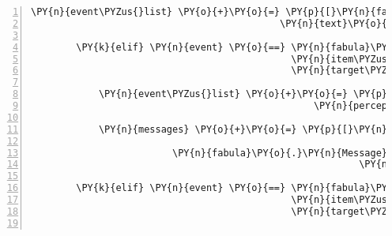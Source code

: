 \begin{Verbatim}[commandchars=\\\{\},numbers=left,firstnumber=1,stepnumber=1]
            \PY{n}{event\PYZus{}list} \PY{o}{+}\PY{o}{=} \PY{p}{[}\PY{n}{fabula}\PY{o}{.}\PY{n}{SaysEvent}\PY{p}{(}\PY{n}{identifier}\PY{o}{=}\PY{l+s}{\PYZsq{}}\PY{l+s}{guardian}\PY{l+s}{\PYZsq{}}\PY{p}{,}
                                            \PY{n}{text}\PY{o}{=}\PY{l+s}{\PYZsq{}}\PY{l+s}{Was soll ich mit einem Klangkörper ohne Saite?}\PY{l+s}{\PYZsq{}}\PY{p}{)}\PY{p}{]}

        \PY{k}{elif} \PY{n}{event} \PY{o}{==} \PY{n}{fabula}\PY{o}{.}\PY{n}{TriesToDropEvent}\PY{p}{(}\PY{n}{identifier}\PY{o}{=}\PY{n}{ID\PYZus{}CASSANDRA}\PY{p}{,}
                                              \PY{n}{item\PYZus{}identifier}\PY{o}{=}\PY{l+s}{\PYZsq{}}\PY{l+s}{lute}\PY{l+s}{\PYZsq{}}\PY{p}{,}
                                              \PY{n}{target\PYZus{}identifier}\PY{o}{=}\PY{n}{ID\PYZus{}KUNI}\PY{p}{)}\PY{p}{:}

            \PY{n}{event\PYZus{}list} \PY{o}{+}\PY{o}{=} \PY{p}{[}\PY{n}{fabula}\PY{o}{.}\PY{n}{PerceptionEvent}\PY{p}{(}\PY{n}{identifier}\PY{o}{=}\PY{n}{ID\PYZus{}CASSANDRA}\PY{p}{,}
                                                  \PY{n}{perception}\PY{o}{=}\PY{l+s}{\PYZsq{}}\PY{l+s}{Kuni schüttelt den Kopf.}\PY{l+s}{\PYZsq{}}\PY{p}{)}\PY{p}{]}

            \PY{n}{messages} \PY{o}{+}\PY{o}{=} \PY{p}{[}\PY{n}{fabula}\PY{o}{.}\PY{n}{Message}\PY{p}{(}\PY{p}{[}\PY{n}{fabula}\PY{o}{.}\PY{n}{PerceptionEvent}\PY{p}{(}\PY{n}{identifier}\PY{o}{=}\PY{n}{ID\PYZus{}KUNI}\PY{p}{,}
                                                                \PY{n}{perception}\PY{o}{=}\PY{l+s}{\PYZsq{}}\PY{l+s}{Cassandra möchte dir die Laute überreichen.}\PY{l+s}{\PYZsq{}}\PY{p}{)}\PY{p}{]}\PY{p}{)}\PY{p}{,}
                         \PY{n}{fabula}\PY{o}{.}\PY{n}{Message}\PY{p}{(}\PY{p}{[}\PY{n}{fabula}\PY{o}{.}\PY{n}{SaysEvent}\PY{p}{(}\PY{n}{identifier}\PY{o}{=}\PY{n}{ID\PYZus{}KUNI}\PY{p}{,}
                                                          \PY{n}{text}\PY{o}{=}\PY{l+s}{\PYZsq{}}\PY{l+s}{Ach, trag du die ruhig mal.}\PY{l+s}{\PYZsq{}}\PY{p}{)}\PY{p}{]}\PY{p}{)}\PY{p}{]}

        \PY{k}{elif} \PY{n}{event} \PY{o}{==} \PY{n}{fabula}\PY{o}{.}\PY{n}{TriesToDropEvent}\PY{p}{(}\PY{n}{identifier}\PY{o}{=}\PY{n}{ID\PYZus{}KUNI}\PY{p}{,}
                                              \PY{n}{item\PYZus{}identifier}\PY{o}{=}\PY{l+s}{\PYZsq{}}\PY{l+s}{lute}\PY{l+s}{\PYZsq{}}\PY{p}{,}
                                              \PY{n}{target\PYZus{}identifier}\PY{o}{=}\PY{n}{ID\PYZus{}CASSANDRA}\PY{p}{)}\PY{p}{:}


\end{Verbatim}
